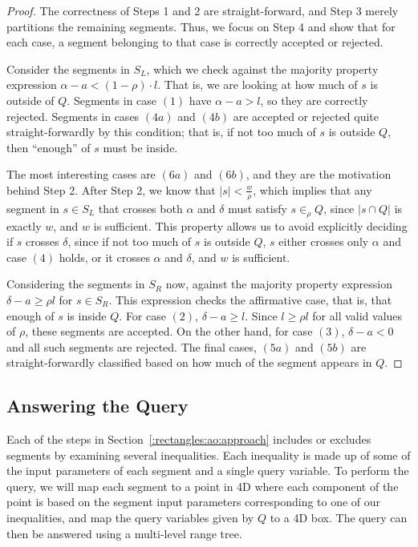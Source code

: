 \begin{proof}
The correctness of Steps 1 and 2 are straight-forward, and Step 3 merely partitions the remaining segments. Thus, we focus on Step 4 and show that for each case, a segment belonging to that case is correctly accepted or rejected.

Consider the segments in $S_L$, which we check against the majority property expression $\alpha - a < (1 - \rho) \cdot l$. That is, we are looking at how much of $s$ is outside of $Q$. Segments in case $(1)$ have $\alpha - a > l$, so they are correctly rejected. Segments in cases $(4a)$ and $(4b)$ are accepted or rejected quite straight-forwardly by this condition; that is, if not too much of $s$ is outside $Q$, then ``enough'' of $s$ must be inside.  

The most interesting cases are $(6a)$ and $(6b)$, and they are the motivation behind Step 2.  After Step 2, we know that $|s| < \frac{w}{\rho}$, which implies that any segment in $s \in S_L$ that crosses both $\alpha$ and $\delta$ must satisfy $s \in_\rho Q$, since $|s \cap Q|$ is exactly $w$, and $w$ is sufficient. This property allows us to avoid explicitly deciding if $s$ crosses $\delta$, since if not too much of $s$ is outside $Q$, $s$ either crosses only $\alpha$ and case $(4)$ holds, or it crosses $\alpha$ and $\delta$, and $w$ is sufficient.

Considering the segments in $S_R$ now, against the majority property expression $\delta - a \geq  \rho l$ for $s \in S_R$. This expression checks the affirmative case, that is, that enough of $s$ is inside $Q$. For case $(2)$, $\delta - a \geq l$. Since $l \geq \rho l$ for all valid values of $\rho$, these segments are accepted.  On the other hand, for case $(3)$, $\delta - a < 0$ and all such segments are rejected. The final cases, $(5a)$ and $(5b)$ are straight-forwardly classified based on how much of the segment appears in $Q$.

\end{proof}


\subsection{Answering the Query}
\label{:rectangles:ap:analysis}

Each of the steps in Section~\ref{:rectangles:ao:approach} includes or excludes segments by examining several inequalities. Each inequality is made up of some of the input parameters of each segment and a single query variable. To perform the query, we will map each segment to a point in 4D where each component of the point is based on the segment input parameters corresponding to one of our inequalities, and map the query variables given by $Q$ to a 4D box.  The query can then be answered using a multi-level range tree.


